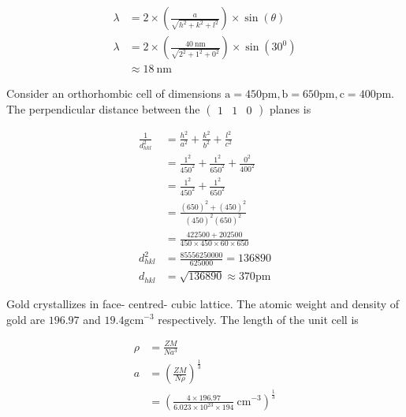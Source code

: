\begin{enumerate}
\begin{answer}
\begin{align*}
		\lambda &=2 \times\left(\frac{a}{\sqrt{h^{2}+k^{2}+l^{2}}}\right) \times \sin (\theta) \\
		\lambda &=2 \times\left(\frac{40 \mathrm{~nm}}{\sqrt{2^{2}+1^{2}+0^{2}}}\right) \times \sin \left(30^{0}\right) \\
		& \approx 18 \mathrm{~nm}
		\end{align*}
	\end{answer}
	\begin{minipage}{\textwidth}
		\item Consider an orthorhombic cell of dimensions $\mathrm{a}=450 \mathrm{pm}, \mathrm{b}=650 \mathrm{pm}, \mathrm{c}=400 \mathrm{pm} .$ The perpendicular distance between the $\left(\begin{array}{lll}1 & 1 & 0\end{array}\right)$ planes is
	\end{minipage}
	\begin{answer}
		$$
		\begin{aligned}
		\frac{1}{d_{h k l}^{2}} &=\frac{h^{2}}{a^{2}}+\frac{k^{2}}{b^{2}}+\frac{l^{2}}{c^{2}} \\
		&=\frac{1^{2}}{450^{2}}+\frac{1^{2}}{650^{2}}+\frac{0^{2}}{400^{2}} \\
		&=\frac{1^{2}}{450^{2}}+\frac{1^{2}}{650^{2}} \\
		&=\frac{(650)^{2}+(450)^{2}}{(450)^{2}(650)^{2}} \\
		&=\frac{422500+202500}{450 \times 450 \times 60 \times 650} \\
		d_{h k l}^{2} &=\frac{85556250000}{625000}=136890 \\
		d_{h k l} &=\sqrt{136890} \approx 370 \mathrm{pm}
		\end{aligned}
		$$	
	\end{answer}
	\begin{minipage}{\textwidth}
		\item Gold crystallizes in face- centred- cubic lattice. The atomic weight and density of gold are $196.97$ and $19.4 \mathrm{gcm}^{-3}$ respectively. The length of the unit cell is
	\end{minipage}
	\begin{answer}
		$$
		\begin{aligned}
		\rho &=\frac{Z M}{N a^{3}} \\
		a &=\left(\frac{Z M}{N \rho}\right)^{\frac{1}{3}} \\
		&=\left(\frac{4 \times 196.97}{6.023 \times 10^{23} \times 194} \mathrm{~cm}^{-3}\right)^{\frac{1}{3}} \\

\end{aligned}$$
\end{answer}
\end{enumerate}
